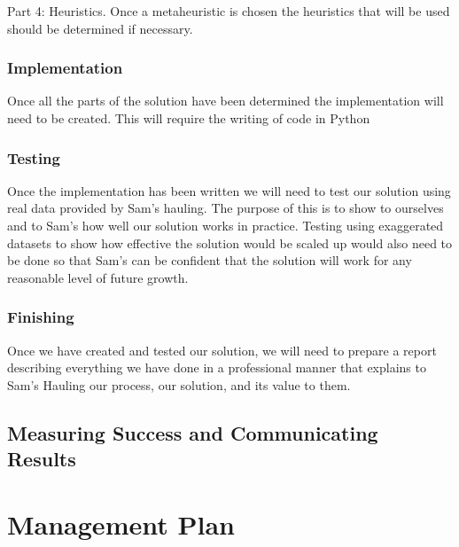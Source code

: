 \documentclass{article}
\begin{document}
Part 4: Heuristics.
Once a metaheuristic is chosen the heuristics that will be used should be determined if necessary.

\subsubsection{Implementation}
Once all the parts of the solution have been determined the implementation will need to be created. This will require the writing of code in Python

\subsubsection{Testing}
Once the implementation has been written we will need to test our solution using real data provided by Sam's hauling. The purpose of this is to show to ourselves and to Sam's how well our solution works in practice. Testing using exaggerated datasets to show how effective the solution would be scaled up would also need to be done so that Sam's can be confident that the solution will work for any reasonable level of future growth.

\subsubsection{Finishing}
Once we have created and tested our solution, we will need to prepare a report describing everything we have done in a professional manner that explains to Sam's Hauling our process, our solution, and its value to them.

\subsection{Measuring Success and Communicating Results}

\section{Management Plan}
\end{document}
